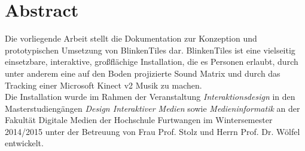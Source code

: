 \section*{Abstract}
Die vorliegende Arbeit stellt die Dokumentation zur Konzeption und prototypischen Umsetzung von BlinkenTiles dar. BlinkenTiles ist eine vielseitig einsetzbare, interaktive, großflächige Installation, die es Personen erlaubt, durch unter anderem eine auf den Boden projizierte Sound Matrix und durch das Tracking einer Microsoft Kinect v2 Musik zu machen.\\
Die Installation wurde im Rahmen der Veranstaltung \textit{Interaktionsdesign} in den Masterstudiengängen \textit{Design Interaktiver Medien} sowie \textit{Medieninformatik} an der Fakultät Digitale Medien der Hochschule Furtwangen im Wintersemester 2014/2015 unter der Betreuung von Frau Prof. Stolz und Herrn Prof. Dr. Wölfel entwickelt.